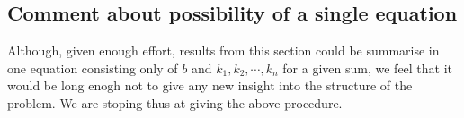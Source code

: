 \subsection{Comment about possibility of a single equation}
Although, given enough effort, results from this section could be summarise in one 
equation consisting only 
of $b$ and $k_1, k_2, \cdots, k_n$ for a given sum, 
we feel that it would be long enogh not to give any new 
insight into the structure of the problem. We are stoping thus at giving the above procedure.


